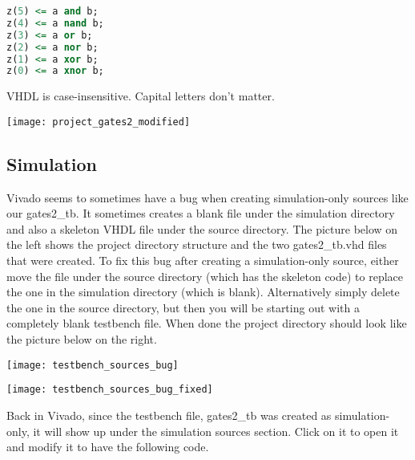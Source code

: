 \begin{lstlisting}[language=VHDL]
z(5) <= a and b;
z(4) <= a nand b;
z(3) <= a or b;
z(2) <= a nor b;
z(1) <= a xor b;
z(0) <= a xnor b;
\end{lstlisting}

\begin{mdframed}[style=note]
    VHDL is case-insensitive. Capital letters don't matter.
\end{mdframed}

\begin{center}
    \texttt{[image: project\_gates2\_modified]}
\end{center}

\subsection{Simulation}

Vivado seems to sometimes have a bug when creating simulation-only sources like our gates2\_tb.
It sometimes creates a blank file under the simulation directory and also a skeleton VHDL file
under the source directory.
The picture below on the left shows the project directory structure and the two gates2\_tb.vhd
files that were created.
To fix this bug after creating a simulation-only source, either move the file under the
source directory (which has the skeleton code) to replace the one in the simulation directory
(which is blank).
Alternatively simply delete the one in the source directory, but then you will be starting out
with a completely blank testbench file.
When done the project directory should look like the picture below on the right.

\vspace{3mm}
\noindent
\begin{minipage}[b]{0.45\textwidth}
    \centering
    \texttt{[image: testbench\_sources\_bug]}
\end{minipage}
\hfill
\begin{minipage}[b]{0.45\textwidth}
    \centering
    \texttt{[image: testbench\_sources\_bug\_fixed]}
\end{minipage}
\vspace{1mm}

Back in Vivado, since the testbench file, gates2\_tb was created as simulation-only,
it will show up under the simulation sources section.
Click on it to open it and modify it to have the following code.

